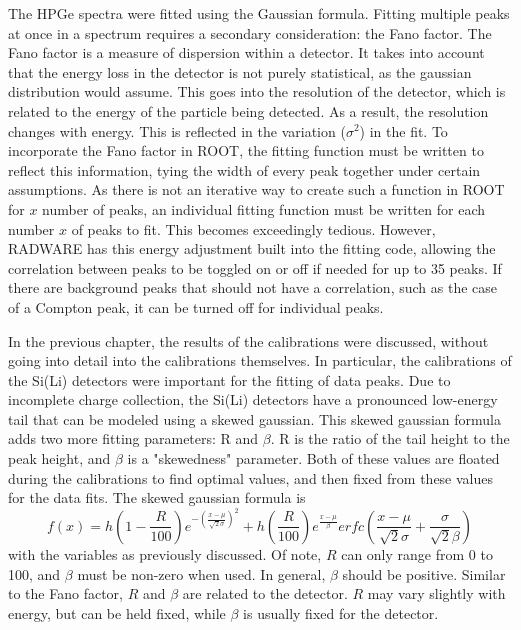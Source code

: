 The HPGe spectra were fitted using the Gaussian formula. Fitting multiple peaks at once in a spectrum requires a secondary consideration: the Fano factor. The Fano factor is a measure of dispersion within a detector\citep{fano47:_factor}. It takes into account that the energy loss in the detector is not purely statistical, as the gaussian distribution would assume. This goes into the resolution of the detector, which is related to the energy of the particle being detected. As a result, the resolution changes with energy. This is reflected in the variation ($\sigma^2$) in the fit. To incorporate the Fano factor in ROOT, the fitting function must be written to reflect this information, tying the width of every peak together under certain assumptions. As there is not an iterative way to create such a function in ROOT for $x$ number of peaks, an individual fitting function must be written for each number $x$ of peaks to fit. This becomes exceedingly tedious. However, RADWARE has this energy adjustment built into the fitting code, allowing the correlation between peaks to be toggled on or off if needed for up to 35 peaks. If there are background peaks that should not have a correlation, such as the case of a Compton peak, it can be turned off for individual peaks.

In the previous chapter, the results of the calibrations were discussed, without going into detail into the calibrations themselves. In particular, the calibrations of the Si(Li) detectors were important for the fitting of data peaks. Due to incomplete charge collection, the Si(Li) detectors have a pronounced low-energy tail that can be modeled using a skewed gaussian. This skewed gaussian formula adds two more fitting parameters: R and $\beta$. R is the ratio of the tail height to the peak height, and $\beta$ is a "skewedness" parameter. Both of these values are floated during the calibrations to find optimal values, and then fixed from these values for the data fits. The skewed gaussian formula is
\begin{equation}
    f(x) = h\left(1-\frac{R}{100}\right)e^{-\left(\frac{x-\mu}{\sqrt{2}\sigma}\right)^2} + h\left(\frac{R}{100}\right)e^{\frac{x-\mu}{\beta}}erfc\left(\frac{x-\mu}{\sqrt{2}\sigma}+\frac{\sigma}{\sqrt{2}\beta}\right)
    \label{eq:skew}
\end{equation}
with the variables as previously discussed. Of note, $R$ can only range from 0 to 100, and $\beta$ must be non-zero when used. In general, $\beta$ should be positive. Similar to the Fano factor, $R$ and $\beta$ are related to the detector. $R$ may vary slightly with energy, but can be held fixed, while $\beta$ is usually fixed for the detector.

